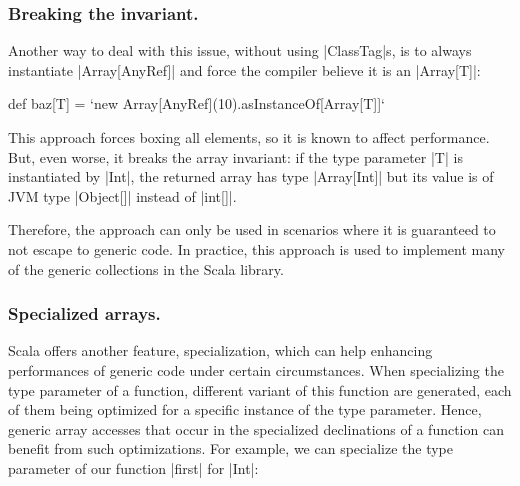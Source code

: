 \subsubsection{Breaking the invariant.} Another way to deal with this issue, without using |ClassTag|s, is to always instantiate |Array[AnyRef]| and force the compiler believe it is an |Array[T]|:

\begin{lstlisting-nobreak}
 def baz[T] = `new Array[AnyRef](10).asInstanceOf[Array[T]]`
\end{lstlisting-nobreak}

This approach forces boxing all elements, so it is known to affect performance. But, even worse, it breaks the array invariant: if the type parameter |T| is instantiated by |Int|, the returned array has type |Array[Int]| but its value is of JVM type |Object[]| instead of |int[]|.

Therefore, the approach can only be used in scenarios where it is guaranteed to not escape to generic code. In practice, this approach is used to implement many of the generic collections in the Scala library.

%



\subsubsection{Specialized arrays.}

Scala offers another feature, specialization, which can help enhancing performances of generic code under certain circumstances. When specializing the type parameter of a function, different variant of this function are generated, each of them being optimized for a specific instance of the type parameter. Hence, generic array accesses that occur in the specialized declinations of a function can benefit from such optimizations. For example, we can specialize the type parameter of our function |first| for |Int|: 

